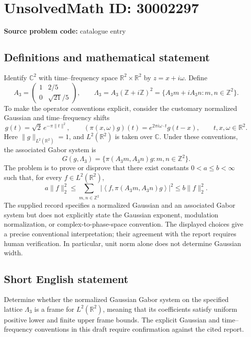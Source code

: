 \documentclass[11pt]{article}
\newcommand{\Z}{\mathbb{Z}}
\newcommand{\R}{\mathbb{R}}
\newcommand{\C}{\mathbb{C}}
\begin{document}
\section*{UnsolvedMath ID: 30002297}
\textbf{Source problem code:} catalogue entry
\subsection{Definitions and mathematical statement}
Identify \(\C^2\) with time--frequency space \(\R^2\times\R^2\) by \(z=x+i\omega\). Define
\[
A_3=\begin{pmatrix}1&2/5\\0&\sqrt{21}/5\end{pmatrix},\qquad
\Lambda_3=A_3(\Z+i\Z)^2
=\{A_3m+iA_3n:m,n\in\Z^2\}.
\]
To make the operator conventions explicit, consider the customary normalized Gaussian and time--frequency shifts
\[
g(t)=\sqrt{2}\,e^{-\pi\lVert t\rVert^2},\qquad
(\pi(x,\omega)g)(t)=e^{2\pi i\omega\cdot t}g(t-x),
\qquad t,x,\omega\in\R^2.
\]
Here \(\lVert g\rVert_{L^2(\R^2)}=1\), and \(L^2(\R^2)\) is taken over \(\C\). Under these conventions, the associated Gabor system is
\[
G(g,\Lambda_3)=\{\pi(A_3m,A_3n)g:m,n\in\Z^2\}.
\]
The problem is to prove or disprove that there exist constants \(0<a\le b<\infty\) such that, for every \(f\in L^2(\R^2)\),
\[
a\lVert f\rVert_2^2
\le \sum_{m,n\in\Z^2}
\left|\left\langle f,\pi(A_3m,A_3n)g\right\rangle\right|^2
\le b\lVert f\rVert_2^2.
\]
The supplied record specifies a normalized Gaussian and an associated Gabor system but does not explicitly state the Gaussian exponent, modulation normalization, or complex-to-phase-space convention. The displayed choices give a precise conventional interpretation; their agreement with the report requires human verification. In particular, unit norm alone does not determine Gaussian width.
\subsection{Short English statement}
Determine whether the normalized Gaussian Gabor system on the specified lattice \(\Lambda_3\) is a frame for \(L^2(\R^2)\), meaning that its coefficients satisfy uniform positive lower and finite upper frame bounds. The explicit Gaussian and time--frequency conventions in this draft require confirmation against the cited report.
\end{document}
